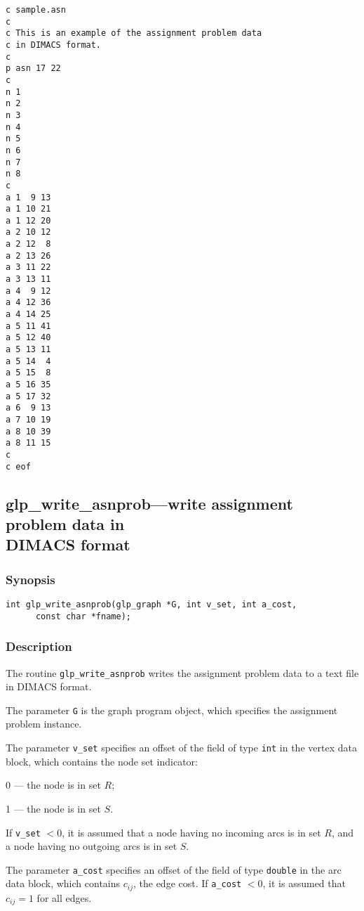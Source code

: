 \documentclass[dvipdfm,11pt]{report}
\begin{document}
\newpage

\begin{footnotesize}
\begin{verbatim}
c sample.asn
c
c This is an example of the assignment problem data
c in DIMACS format.
c
p asn 17 22
c
n 1
n 2
n 3
n 4
n 5
n 6
n 7
n 8
c
a 1  9 13
a 1 10 21
a 1 12 20
a 2 10 12
a 2 12  8
a 2 13 26
a 3 11 22
a 3 13 11
a 4  9 12
a 4 12 36
a 4 14 25
a 5 11 41
a 5 12 40
a 5 13 11
a 5 14  4
a 5 15  8
a 5 16 35
a 5 17 32
a 6  9 13
a 7 10 19
a 8 10 39
a 8 11 15
c
c eof
\end{verbatim}
\end{footnotesize}

\newpage

\subsection{glp\_write\_asnprob---write assignment problem data in\\
DIMACS format}

\subsubsection*{Synopsis}

\begin{verbatim}
int glp_write_asnprob(glp_graph *G, int v_set, int a_cost,
      const char *fname);
\end{verbatim}

\subsubsection*{Description}

The routine \verb|glp_write_asnprob| writes the assignment problem data
to a text file in DIMACS format.

The parameter \verb|G| is the graph program object, which specifies the
assignment problem instance.

The parameter \verb|v_set| specifies an offset of the field of type
\verb|int| in the vertex data block, which contains the node set
indicator:

0 --- the node is in set $R$;

1 --- the node is in set $S$.

\noindent
If \verb|v_set| $<0$, it is assumed that a node having no incoming arcs
is in set $R$, and a node having no outgoing arcs is in set $S$.

The parameter \verb|a_cost| specifies an offset of the field of type
\verb|double| in the arc data block, which contains $c_{ij}$, the edge
cost. If \verb|a_cost| $<0$, it is assumed that $c_{ij}=1$ for all
edges.
\end{document}
